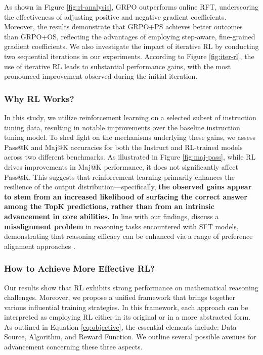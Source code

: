 \begin{itemize}[topsep=0pt]
\begin{itemize}[topsep=0pt]
As shown in Figure \ref{fig:rl-analysis}, GRPO outperforms online RFT, underscoring the effectiveness of adjusting positive and negative gradient coefficients. Moreover, the results demonstrate that GRPO+PS achieves better outcomes than GRPO+OS, reflecting the advantages of employing step-aware, fine-grained gradient coefficients. We also investigate the impact of iterative RL by conducting two sequential iterations in our experiments. According to Figure \ref{fig:iter-rl}, the use of iterative RL leads to substantial performance gains, with the most pronounced improvement observed during the initial iteration.

\subsubsection{Why RL Works?} In this study, we utilize reinforcement learning on a selected subset of instruction tuning data, resulting in notable improvements over the baseline instruction tuning model. To shed light on the mechanisms underlying these gains, we assess Pass@K and Maj@K accuracies for both the Instruct and RL-trained models across two different benchmarks. As illustrated in Figure \ref{fig:maj-pass}, while RL drives improvements in Maj@K performance, it does not significantly affect Pass@K. This suggests that reinforcement learning primarily enhances the resilience of the output distribution—specifically, \textbf{the observed gains appear to stem from an increased likelihood of surfacing the correct answer among the TopK predictions, rather than from an intrinsic advancement in core abilities.} In line with our findings, \citep{wang2023making} discuss a \textbf{misalignment problem} in reasoning tasks encountered with SFT models, demonstrating that reasoning efficacy can be enhanced via a range of preference alignment approaches \citep{yuan2023rrhf,song2023preference,wang2023making}.

\subsubsection{How to Achieve More Effective RL?}
\label{sec:effec_rl}
Our results show that RL exhibits strong performance on mathematical reasoning challenges. Moreover, we propose a unified framework that brings together various influential training strategies. In this framework, each approach can be interpreted as employing RL either in its original or in a more abstracted form. As outlined in Equation \ref{eq:objective}, the essential elements include: Data Source, Algorithm, and Reward Function. We outline several possible avenues for advancement concerning these three aspects.


\end{itemize}
\end{itemize}
